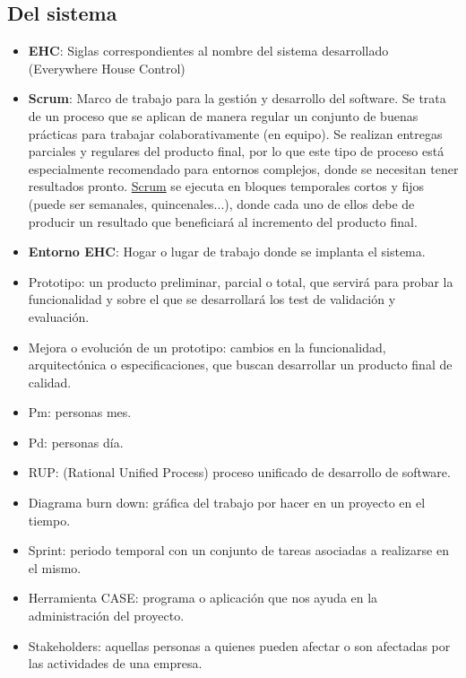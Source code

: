     \subsection{Del sistema}
        \begin{itemize}
            \item { \bf EHC}: Siglas correspondientes al nombre del sistema desarrollado (Everywhere House Control)
            \item { \bf Scrum}: Marco de trabajo para la gestión y desarrollo del software. Se trata de un proceso que se aplican de manera regular un conjunto de buenas prácticas para trabajar colaborativamente (en equipo). Se realizan entregas parciales y regulares del producto final, por lo que este tipo de proceso está especialmente recomendado para entornos complejos, donde se necesitan tener resultados pronto. \href{http://es.wikipedia.org/wiki/Scrum}{Scrum} se ejecuta en bloques temporales cortos y fijos (puede ser semanales, quincenales...), donde cada uno de ellos debe de producir un resultado que beneficiará al incremento del producto final. 
            \item { \bf Entorno EHC}: Hogar o lugar de trabajo donde se implanta el sistema.
			\item { \bf }	Prototipo: un producto preliminar, parcial o total, que servirá para probar la funcionalidad y sobre el que se desarrollará los test de validación y evaluación. 
			\item { \bf }	Mejora o evolución de un prototipo: cambios en la funcionalidad, arquitectónica o especificaciones, que buscan desarrollar un producto final de calidad.
			\item { \bf	} Pm: personas mes.
			\item { \bf	} Pd: personas día.			
			\item { \bf	} RUP: (Rational Unified Process) proceso unificado de desarrollo de software.
			\item { \bf	} Diagrama burn down: gráfica del trabajo por hacer en un proyecto en el tiempo.
			\item { \bf	} Sprint: periodo temporal con un conjunto de tareas asociadas a realizarse en el mismo.
			\item { \bf	} Herramienta CASE: programa o aplicación que nos ayuda en la administración del proyecto.
			\item { \bf	} Stakeholders: aquellas personas a quienes pueden afectar o son afectadas por las actividades de una empresa.            
        \end{itemize}
